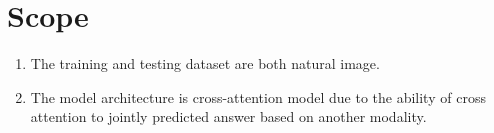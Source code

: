 \section{Scope}
\begin{enumerate}
    \item The training and testing dataset are both natural image.
    \item The model architecture is cross-attention model due to the ability of cross attention to jointly predicted answer based on another modality.
\end{enumerate}


